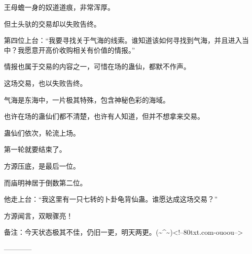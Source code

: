 \begin{this_body}
王母蟾一身的奴道道痕，非常浑厚。

但土头驮的交易却以失败告终。

第四位上台：“我要寻找关于气海的线索。谁知道该如何寻找到气海，并且进入当中？我愿意开高价收购相关有价值的情报。”

情报也属于交易的内容之一，可惜在场的蛊仙，都默不作声。

这场交易，也以失败告终。

气海是东海中，一片极其特殊，包含神秘色彩的海域。

也许在场的蛊仙们都不清楚，也许有人知道，但并不想拿来交易。

蛊仙们依次，轮流上场。

第一轮就要结束了。

方源压底，是最后一位。

而庙明神居于倒数第二位。

他走上台：“我这里有一只七转的卜卦龟背仙蛊。谁愿达成这场交易？”

方源闻言，双眼骤亮！

备注：今天状态极其不佳，仍旧一更，明天两更。(\~{}\^{}\~{})<!--80txt.com-ouoou-->

------------

\end{this_body}

